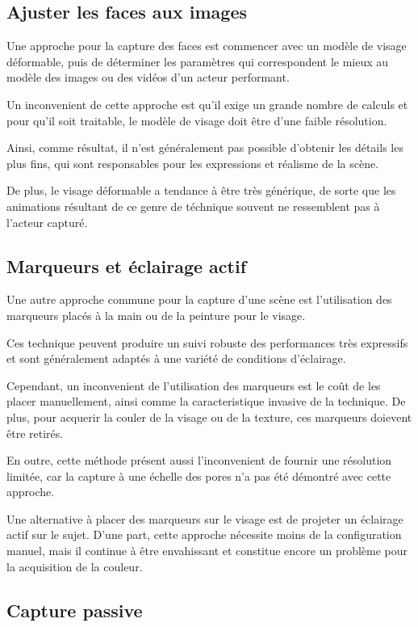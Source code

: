 \documentclass[a4paper,12pt]{article}
\begin{document}
\subsection*{Ajuster les faces aux images}
Une approche pour la capture des faces est commencer avec un modèle
de visage déformable, puis de déterminer les paramètres qui
correspondent le mieux au modèle des images ou des vidéos d'un acteur
performant. 

Un inconvenient de cette approche est qu'il exige un grande nombre de
calculs et pour qu'il soit traitable, le modèle de visage doit être
d'une faible résolution.

Ainsi, comme résultat, il n'est généralement pas possible d'obtenir les
détails les plus fins, qui sont responsables pour les expressions et
réalisme de la scène.

De plus, le visage déformable a tendance à être très générique, de
sorte que les animations résultant de ce genre de téchnique souvent ne
ressemblent pas à l'acteur capturé.

\subsection*{Marqueurs et éclairage actif}

Une autre approche commune pour la capture d'une scène est
l'utilisation des marqueurs placés à la main ou de la peinture pour le
visage.

Ces technique peuvent produire un suivi robuste des performances très
expressifs et sont généralement adaptés à une variété de conditions
d'éclairage.

Cependant, un inconvenient de l'utilisation des marqueurs est le coût
de les placer manuellement, ainsi comme la caracteristique invasive de
la technique. De plus, pour acquerir la couler de la visage ou de la
texture, ces marqueurs doievent être retirés. 

En outre, cette méthode présent aussi l'inconvenient de fournir une
résolution limitée, car la capture à une échelle des pores n'a pas été
démontré avec cette approche. 

Une alternative à placer des marqueurs sur le visage est de projeter
un éclairage actif sur le sujet. D'une part, cette approche nécessite
moins de la configuration manuel, mais il continue à être envahissant
et constitue encore un problème pour la acquisition de la couleur. 

\subsection*{Capture passive }
\end{document}
